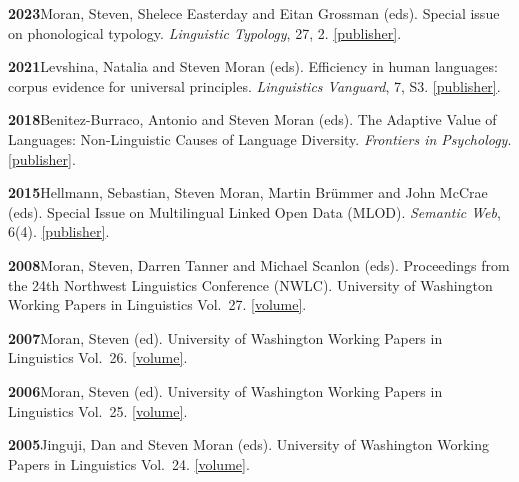 \documentclass[11pt]{article}
\newcommand{\hangpara}{
 \setlength{\parindent}{0in} %
 \hangindent=0.42in %
}
\begin{document}
\hangpara
\vskip 6pt
{\bf 2023}\hspace{1ex}Moran, Steven, Shelece Easterday and Eitan Grossman (eds). Special issue on phonological typology. {\it Linguistic Typology}, 27, 2. \href{https://www.degruyter.com/journal/key/lity/27/2/html}{[publisher]}.

\hangpara
\vskip 6pt
{\bf 2021}\hspace{1ex}Levshina, Natalia and Steven Moran (eds). Efficiency in human languages: corpus evidence for universal principles. {\it Linguistics Vanguard}, 7, S3. \href{https://www.degruyter.com/journal/key/LINGVAN/7/s3/html}{[publisher]}.

\hangpara
\vskip 6pt
{\bf 2018}\hspace{1ex}Benitez-Burraco, Antonio and Steven Moran (eds). The Adaptive Value of Languages: Non-Linguistic Causes of Language Diversity. {\it Frontiers in Psychology}. \href{https://www.frontiersin.org/research-topics/5478/the-adaptive-value-of-languages-non-linguistic-causes-of-language-diversity/magazine}{[publisher]}.

\hangpara
\vskip 6pt
{\bf 2015}\hspace{1ex}Hellmann, Sebastian, Steven Moran, Martin Brümmer and John McCrae (eds). Special Issue on Multilingual Linked Open Data (MLOD). \textit{Semantic Web}, 6(4). \href{https://content.iospress.com/journals/semantic-web/6/4}{[publisher]}.

\vskip 6pt
\hangpara
{\bf 2008}\hspace{1ex}Moran, Steven, Darren Tanner and Michael Scanlon (eds). Proceedings from the 24th Northwest Linguistics Conference (NWLC). University of Washington Working Papers in Linguistics Vol.\ 27. \href{https://depts.washington.edu/uwwpl/editions/vol27.html}{[volume]}.

\vskip 6pt
\hangpara
{\bf 2007}\hspace{1ex}Moran, Steven (ed). University of Washington Working Papers in Linguistics Vol.\ 26. \href{https://depts.washington.edu/uwwpl/editions/vol26.html}{[volume]}.

\vskip 6pt
\hangpara
{\bf 2006}\hspace{1ex}Moran, Steven (ed). University of Washington Working Papers in Linguistics Vol.\ 25. \href{https://depts.washington.edu/uwwpl/editions/vol25.html}{[volume]}.

\vskip 6pt
\hangpara
{\bf 2005}\hspace{1ex}Jinguji, Dan and Steven Moran (eds). University of Washington Working Papers in Linguistics Vol.\ 24. \href{https://depts.washington.edu/uwwpl/editions/vol24.html}{[volume]}.
\end{document}
